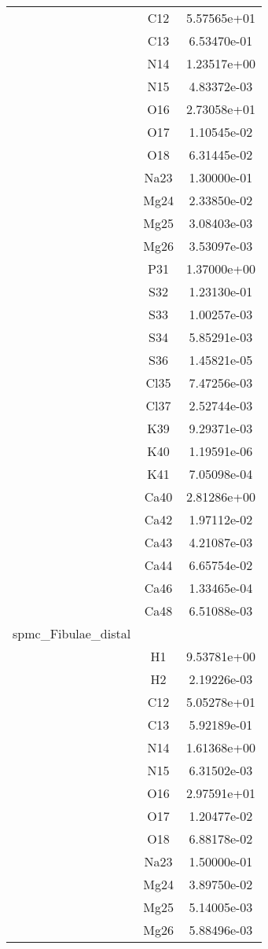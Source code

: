 \begin{centering}
\begin{longtable}{l c c}
& C12 & 5.57565e+01 \\ 
& C13 & 6.53470e-01 \\ 
& N14 & 1.23517e+00 \\ 
& N15 & 4.83372e-03 \\ 
& O16 & 2.73058e+01 \\ 
& O17 & 1.10545e-02 \\ 
& O18 & 6.31445e-02 \\ 
& Na23 & 1.30000e-01 \\ 
& Mg24 & 2.33850e-02 \\ 
& Mg25 & 3.08403e-03 \\ 
& Mg26 & 3.53097e-03 \\ 
& P31 & 1.37000e+00 \\ 
& S32 & 1.23130e-01 \\ 
& S33 & 1.00257e-03 \\ 
& S34 & 5.85291e-03 \\ 
& S36 & 1.45821e-05 \\ 
& Cl35 & 7.47256e-03 \\ 
& Cl37 & 2.52744e-03 \\ 
& K39 & 9.29371e-03 \\ 
& K40 & 1.19591e-06 \\ 
& K41 & 7.05098e-04 \\ 
& Ca40 & 2.81286e+00 \\ 
& Ca42 & 1.97112e-02 \\ 
& Ca43 & 4.21087e-03 \\ 
& Ca44 & 6.65754e-02 \\ 
& Ca46 & 1.33465e-04 \\ 
& Ca48 & 6.51088e-03 \\ 
\hline
spmc_Fibulae_distal & & \\
\hline
& H1 & 9.53781e+00 \\ 
& H2 & 2.19226e-03 \\ 
& C12 & 5.05278e+01 \\ 
& C13 & 5.92189e-01 \\ 
& N14 & 1.61368e+00 \\ 
& N15 & 6.31502e-03 \\ 
& O16 & 2.97591e+01 \\ 
& O17 & 1.20477e-02 \\ 
& O18 & 6.88178e-02 \\ 
& Na23 & 1.50000e-01 \\ 
& Mg24 & 3.89750e-02 \\ 
& Mg25 & 5.14005e-03 \\ 
& Mg26 & 5.88496e-03 \\ 

\end{longtable}
\end{centering}
